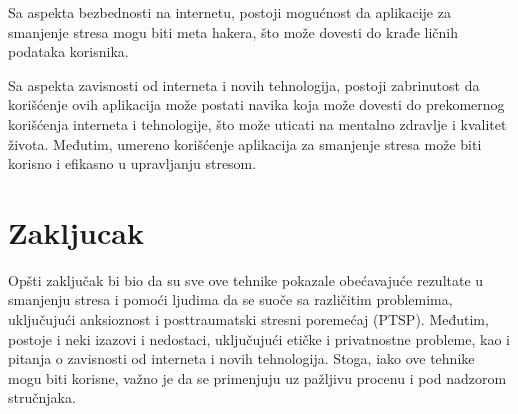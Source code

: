 \documentclass[a4paper]{article}
\begin{document}
Sa aspekta bezbednosti na internetu, postoji mogućnost da aplikacije za smanjenje stresa mogu biti meta hakera, što može dovesti do krađe ličnih podataka korisnika.

Sa aspekta zavisnosti od interneta i novih tehnologija, postoji zabrinutost da korišćenje ovih aplikacija može postati navika koja može dovesti do prekomernog korišćenja interneta i tehnologije, što može uticati na mentalno zdravlje i kvalitet života. Međutim, umereno korišćenje aplikacija za smanjenje stresa može biti korisno i efikasno u upravljanju stresom.


\section{Zakljucak}
\label{sec:zakljucak}
Opšti zaključak bi bio da su sve ove tehnike pokazale obećavajuće rezultate u smanjenju stresa i pomoći ljudima da se suoče sa različitim problemima, uključujući anksioznost i posttraumatski stresni poremećaj (PTSP). Međutim, postoje i neki izazovi i nedostaci, uključujući etičke i privatnostne probleme, kao i pitanja o zavisnosti od interneta i novih tehnologija. Stoga, iako ove tehnike mogu biti korisne, važno je da se primenjuju uz pažljivu procenu i pod nadzorom stručnjaka.

\appendix

\iffalse
 

\fi
\end{document}
